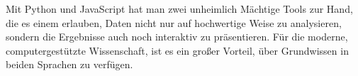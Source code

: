 Mit Python und JavaScript hat man zwei unheimlich Mächtige Tools zur
Hand, die es einem erlauben, Daten nicht nur auf hochwertige Weise zu
analysieren, sondern die Ergebnisse auch noch interaktiv zu
präsentieren. Für die moderne, computergestützte Wissenschaft, ist es
ein großer Vorteil, über Grundwissen in beiden Sprachen zu verfügen.


